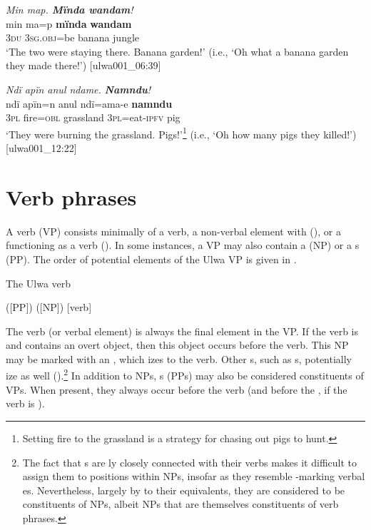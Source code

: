 
\ea%
    \label{ex:phrase:38}
          \textit{Min map. \textbf{Mïnda wandam}!}\\
\gll    min ma=p \textbf{mïnda}  \textbf{wandam}\\
    \textsc{3du} \textsc{3sg.obj}=be banana  jungle\\
\glt `The two were staying there. Banana garden!’ (i.e., ‘Oh what a banana garden they made there!’) [ulwa001\_06:39]
\z

\ea%
    \label{ex:phrase:39}
          \textit{Ndï apïn anul ndame.} 
          \textit{\textbf{Namndu}!}\\
\gll    ndï  apïn=n    anul    ndï=ama-e    \textbf{namndu}\\
    3\textsc{pl}  fire=\textsc{obl}  grassland  3\textsc{pl}=eat-\textsc{ipfv}  pig\\
\glt `They were burning the grassland. Pigs!’\footnote{Setting fire to the grassland is a strategy for chasing out pigs to hunt.} (i.e., ‘Oh how many pigs they killed!’) [ulwa001\_12:22]
\z

\section{Verb phrases}\label{sec:9.2}


A verb  (VP) consists minimally of a verb, a non-verbal element with  (), or a  functioning as a verb (). In some instances, a VP may also contain a  (NP) or a s (PP). The order of potential elements of the Ulwa VP is given in .

\ea%
    \label{ex:phrase:40}
          The Ulwa verb 

    ([PP]) ([NP]) [verb]
\z

The verb (or verbal element) is always the final element in the VP. If the verb is  and contains an overt object, then this object  occurs before the verb. This NP may be marked with an , which izes to the verb. Other s, such as s, potentially ize as well ().\footnote{The fact that s are ly closely connected with their verbs makes it difficult to assign them to positions within NPs, insofar as they resemble -marking verbal es. Nevertheless, largely by  to their  equivalents, they are considered to be  constituents of NPs, albeit NPs that are themselves constituents of verb phrases.} In addition to NPs, s (PPs) may also be considered constituents of VPs. When present, they always occur before the verb (and before the , if the verb is ).

